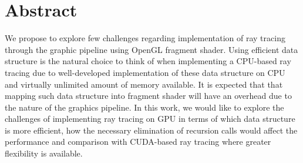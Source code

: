\section{Abstract}
We propose to explore few challenges regarding implementation of ray tracing through the graphic pipeline using OpenGL fragment shader. Using efficient data structure is the natural choice to think of when implementing a CPU-based ray tracing due to well-developed implementation of these data structure on CPU and virtually unlimited amount of memory available. It is expected that that mapping such data structure into fragment shader will have an overhead due to the nature of the graphics pipeline. In this work, we would like to explore the challenges of implementing ray tracing on GPU in terms of which data structure is more efficient, how the necessary elimination of recursion calls would affect the performance and comparison with CUDA-based ray tracing where greater flexibility is available. 
